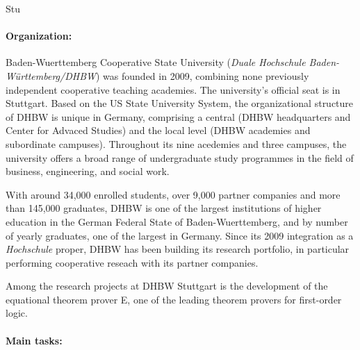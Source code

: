 \begin{sitedescription}{Stu}

\paragraph{Organization:}



Baden-Wuerttemberg Cooperative State University (\emph{Duale
  Hochschule Baden-Württemberg/DHBW}) was founded in 2009, combining
none previously independent cooperative teaching academies. The
university's official seat is in Stuttgart. Based on the US State
University System, the organizational structure of DHBW is unique in
Germany, comprising a central (DHBW headquarters and Center for
Advaced Studies) and the local level (DHBW academies and subordinate
campuses). Throughout its nine acedemies and three campuses, the
university offers a broad range of undergraduate study programmes in
the field of business, engineering, and social work.


With around 34,000 enrolled students, over 9,000 partner companies and
more than 145,000 graduates, DHBW is one of the largest institutions
of higher education in the German Federal State of Baden-Wuerttemberg,
and by number of yearly graduates, one of the largest in Germany.
Since its 2009 integration as a \emph{Hochschule} proper, DHBW has
been building its research portfolio, in particular performing
cooperative reseach with its partner companies.

Among the research projects at DHBW Stuttgart is the development of
the equational theorem prover E, one of the leading theorem provers
for first-order logic.


\paragraph{Main tasks:}


\end{sitedescription}
